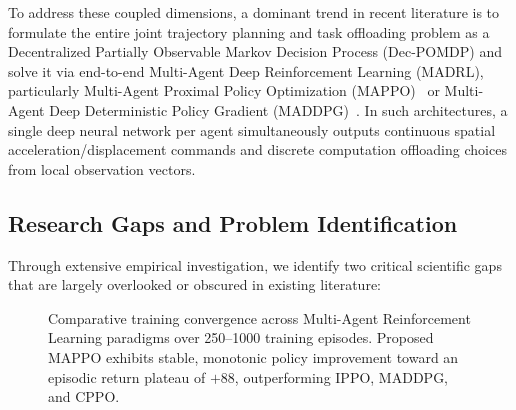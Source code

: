 \documentclass[conference]{IEEEtran}
\begin{document}
To address these coupled dimensions, a dominant trend in recent literature is to formulate the entire joint trajectory planning and task offloading problem as a Decentralized Partially Observable Markov Decision Process (Dec-POMDP) and solve it via end-to-end Multi-Agent Deep Reinforcement Learning (MADRL), particularly Multi-Agent Proximal Policy Optimization (MAPPO)~\cite{yu2022mappo} or Multi-Agent Deep Deterministic Policy Gradient (MADDPG)~\cite{lowe2017maddpg}. In such architectures, a single deep neural network per agent simultaneously outputs continuous spatial acceleration/displacement commands and discrete computation offloading choices from local observation vectors.

\subsection{Research Gaps and Problem Identification}
Through extensive empirical investigation, we identify two critical scientific gaps that are largely overlooked or obscured in existing literature:

\begin{figure}[!t]
\centering
\caption{Comparative training convergence across Multi-Agent Reinforcement Learning paradigms over 250--1000 training episodes. Proposed MAPPO exhibits stable, monotonic policy improvement toward an episodic return plateau of $+88$, outperforming IPPO, MADDPG, and CPPO.}
\label{fig:training_return}
\end{figure}
\end{document}
